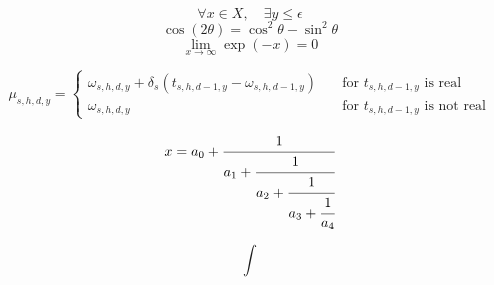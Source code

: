 \documentclass[a4paper]{slides}
\begin{document}
$$ \forall x \in X, \quad \exists y \leq \epsilon $$
$$ \cos (2\theta) = \cos^2 \theta - \sin^2 \theta $$
$$ \lim_{x \to \infty} \exp(-x) = 0 $$

$$ \mu_{s,h,d,y} = \begin{cases}
    \omega_{s,h,d,y} + \delta_{s}(t_{s,h,d-1,y} - \omega_{s,h,d-1,y}) & \quad \text{for $t_{s,h,d-1,y}$ is real} \\
    \omega_{s,h,d,y} & \quad \text{for $t_{s,h,d-1,y}$ is not real}
  \end{cases}
$$

$$ \begin{equation}
  x = a_0 + \cfrac{1}{a_1 \\
          + \cfrac{1}{a_2 \\
          + \cfrac{1}{a_3 + \cfrac{1}{a_4} } } }
  \end{equation}
$$

$$ \int $$
\end{document}
